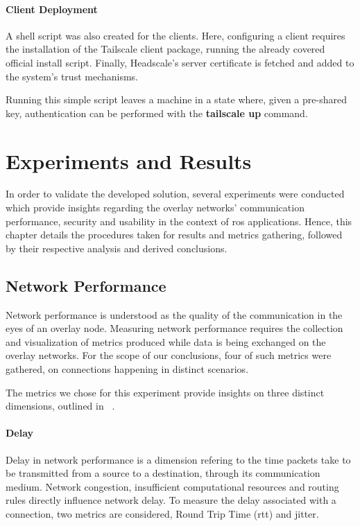 \documentclass[11pt,twoside,a4paper]{report}
\begin{document}
\subsubsection{Client Deployment}

A shell script was also created for the clients. Here, configuring a client requires the installation of the Tailscale client package, running the already covered official install script. Finally, Headscale's server certificate is fetched and added to the system's trust mechanisms.

Running this simple script leaves a machine in a state where, given a pre-shared key, authentication can be performed with the \textbf{tailscale up} command.

\chapter{Experiments and Results}
\label{chap:results}

In order to validate the developed solution, several experiments were conducted which provide insights regarding the overlay networks' communication performance, security and usability in the context of \ac{ros} applications. Hence, this chapter details the procedures taken for results and metrics gathering, followed by their respective analysis and derived conclusions.

\section{Network Performance}

Network performance is understood as the quality of the communication in the eyes of an overlay node. Measuring network performance requires the collection  and visualization of metrics produced while data is being exchanged on the overlay networks. For the scope of our conclusions, four of such metrics were gathered, on connections happening in distinct scenarios.

The metrics we chose for this experiment provide insights on three distinct dimensions, outlined in ~\cite{livronet, Hanemann2006}.

\subsubsection{Delay}

Delay in network performance is a dimension refering to the time packets take to be transmitted from a source to a destination, through its communication medium. Network congestion, insufficient computational resources and routing rules directly influence network delay. To measure the delay associated with a connection, two metrics are considered, Round Trip Time (\ac{rtt}) and jitter.
\end{document}
